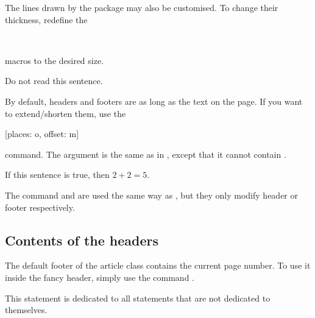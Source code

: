 The lines drawn by the  package may also be customised. To change
their thickness, redefine the
\begin{lscommand}
   \\
\end{lscommand}
macros to the desired size.
\begin{example}[standalone, paperheight=3cm, paperwidth=3cm]
\geometry{includefoot, includehead, headsep=.5em, footskip=1em} %
\sloppy %
\usepackage{fancyhdr} %
\pagestyle{fancy} %
\RenewDocumentCommand{\headrulewidth}{}{.2cm}
\RenewDocumentCommand{\footrulewidth}{}{.5cm}

\noindent %
Do not read this sentence.
\end{example}

By default, headers and footers are as long as the text on the page. If you want
to extend\slash{}shorten them, use the
\begin{lscommand}
  [places: o, offset: m]
\end{lscommand}
command. The  argument is the same as in , except that
it cannot contain .
\begin{example}[standalone, paperheight=3cm]
\geometry{includehead, includefoot, headsep=.5em, footskip=1em} %
\sloppy %
\usepackage{fancyhdr}%
\pagestyle{fancy}%
\fancyhfoffset[L]{-1cm}
\fancyhfoffset[R]{.2cm}

\noindent %
If this sentence is true,
then \(2 + 2 = 5\).
\end{example}
The command  and  are
used the same way as , but they only modify header or footer respectively.

\subsection{Contents of the headers}


The default footer of the article class contains the current page number. To
use it inside the fancy header, simply use the command .
\begin{example}[standalone, paperheight=2.5cm, to_page=2, vertical_pages]
\geometry{includehead, includefoot, headsep=.5em, footskip=1em} %
\sloppy %
\usepackage{fancyhdr}%
\pagestyle{fancy}%

\noindent %
This statement is dedicated to
all statements that are not
dedicated to themselves.
\end{example}

